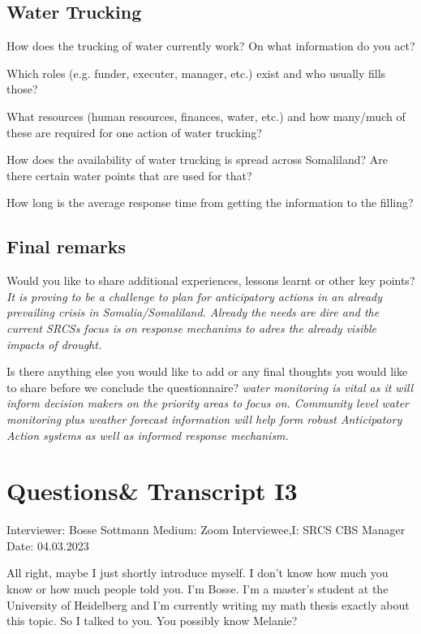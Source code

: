 \subsection*{Water Trucking}

How does the trucking of water currently work? On what information do you act?

Which roles (e.g. funder, executer, manager, etc.) exist and who usually fills those?

What resources (human resources, finances, water, etc.) and how many/much of these are required for one action of water trucking?

How does the availability of water trucking is spread across Somaliland? Are there certain water points that are used for that?

How long is the average response time from getting the information to the filling?

\subsection*{Final remarks}
Would you like to share additional experiences, lessons learnt or other key points?\newline
\textit{It is proving to be a challenge to plan for anticipatory actions in an already prevailing crisis in Somalia/Somaliland. Already the needs are dire and the current SRCSs focus is on response mechanims to adres the already visible impacts of drought.}

Is there anything else you would like to add or any final thoughts you would like to share before we conclude the questionnaire?
\textit{water monitoring is vital as it will inform decision makers on the priority areas to focus on. Community level water monitoring plus weather forecast information will help form robust Anticipatory Action systems as well as informed response mechanism.}


\section{Questions\& Transcript I3}
Interviewer: Bosse Sottmann\newline
Medium: Zoom\newline
Interviewee,I: SRCS CBS Manager \newline
Date: 04.03.2023

All right, maybe I just shortly introduce myself. I don't know how much you know or how much people told you. I'm Bosse. I'm a master's student at the University of Heidelberg and I'm currently writing my math thesis exactly about this topic. So I talked to you. You possibly know Melanie? 

